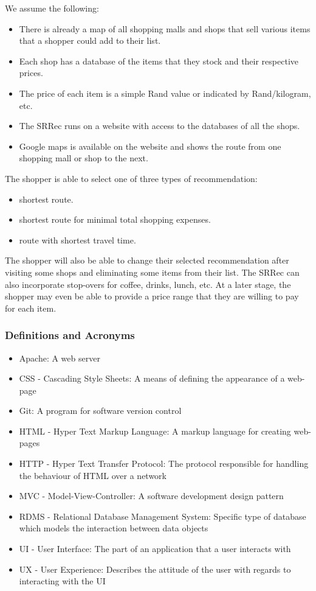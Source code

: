 \documentclass[10pt,twocolumn]{witseiepaper}
\begin{document}
			We assume the following:
			\begin{itemize}
				\item There is already a map of all shopping malls and shops that sell various items that a shopper could add to their list.
				\item Each shop has a database of the items that they stock and their respective prices.
				\item The price of each item is a simple Rand value or indicated by Rand/kilogram, etc.
				\item The SRRec runs on a website with access to the databases of all the shops.
				\item Google maps is available on the website and shows the route from one shopping mall or shop to the next.
			\end{itemize}
			
			The shopper is able to select one of three types of recommendation:
			\begin{itemize}
				\item shortest route.
				\item shortest route for minimal total shopping expenses.
				\item route with shortest travel time.
			\end{itemize}
			
			The shopper will also be able to change their selected recommendation after visiting some shops and eliminating some items from their list. The SRRec can also incorporate stop-overs for coffee, drinks, lunch, etc. At a later stage, the shopper may even be able to provide a price range that they are willing to pay for each item.
			
		\subsubsection{Definitions and Acronyms}
		
			\begin{itemize}
				\item Apache: A web server
				\item CSS - Cascading Style Sheets: A means of defining the appearance of a web-page
				\item Git: A program for software version control
				\item HTML - Hyper Text Markup Language: A markup language for creating web-pages
				\item HTTP - Hyper Text Transfer Protocol: The protocol responsible for handling the behaviour of HTML over a network
				\item MVC - Model-View-Controller: A software development design pattern
				\item RDMS - Relational Database Management System: Specific type of database which models the interaction between data objects
				\item UI - User Interface: The part of an application that a user interacts with
				\item UX - User Experience: Describes the attitude of the user with regards to interacting with the UI
				
			\end{itemize}
		
\end{document}
